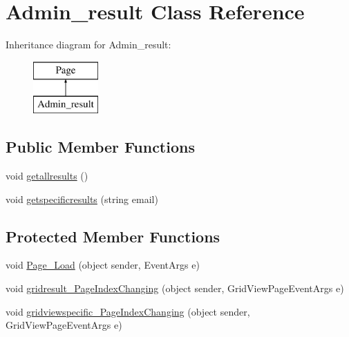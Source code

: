 \hypertarget{class_admin__result}{}\section{Admin\+\_\+result Class Reference}
\label{class_admin__result}
Inheritance diagram for Admin\+\_\+result\+:\begin{figure}[H]
\begin{center}
\leavevmode
\includegraphics[height=2.000000cm]{class_admin__result}
\end{center}
\end{figure}
\subsection*{Public Member Functions}
\begin{DoxyCompactItemize}
\item 
void \mbox{\hyperlink{class_admin__result_a2fec56d4ce397f2c9e36135a3efbf4c8}{getallresults}} ()
\item 
void \mbox{\hyperlink{class_admin__result_a6f34085888eaa6bd6e4d0ec96658a1e3}{getspecificresults}} (string email)
\end{DoxyCompactItemize}
\subsection*{Protected Member Functions}
\begin{DoxyCompactItemize}
\item 
void \mbox{\hyperlink{class_admin__result_aa4c21526d15278e1431660b24134f061}{Page\+\_\+\+Load}} (object sender, Event\+Args e)
\item 
void \mbox{\hyperlink{class_admin__result_af04a0c04f4d550a2ae0ae1189ec577ae}{gridresult\+\_\+\+Page\+Index\+Changing}} (object sender, Grid\+View\+Page\+Event\+Args e)
\item 
void \mbox{\hyperlink{class_admin__result_a49a732d0a1d0168c0895685950216e82}{gridviewspecific\+\_\+\+Page\+Index\+Changing}} (object sender, Grid\+View\+Page\+Event\+Args e)
\end{DoxyCompactItemize}
